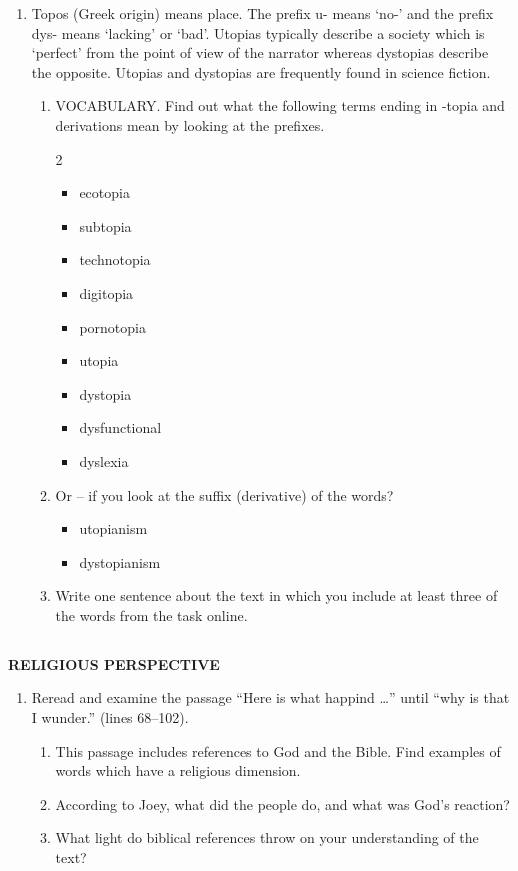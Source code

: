 \documentclass[10pt,a4paper,table]{article}
\newcommand{\qm}[1]{``#1''}
\begin{document}
\begin{enumerate}[label=\arabic*., leftmargin=*]
  \item Topos (Greek origin) means place. The prefix u- means `no-' and the prefix dys- means `lacking' or `bad'. Utopias typically describe a society which is `perfect' from the point of view of the narrator whereas dystopias describe the opposite. Utopias and dystopias are frequently found in science fiction.
  \begin{enumerate}[label=\textbf{\alph*.}, leftmargin=1.5em]
    \item VOCABULARY. Find out what the following terms ending in -topia and derivations mean by looking at the prefixes.
    \begin{multicols}{2}
    \begin{itemize}[leftmargin=1.5em]
      \item ecotopia
      \item subtopia
      \item technotopia
      \item digitopia
      \item pornotopia
      \item utopia
      \item dystopia
      \item dysfunctional
      \item dyslexia
    \end{itemize}
    \end{multicols}

    \item Or -- if you look at the suffix (derivative) of the words?
    \begin{itemize}[leftmargin=1.5em]
      \item utopianism
      \item dystopianism
    \end{itemize}

    \item Write one sentence about the text in which you include at least three of the words from the task online.
  \end{enumerate}
\end{enumerate}

\subsection{}
\textbf{RELIGIOUS PERSPECTIVE}
\begin{enumerate}[label=\arabic*., leftmargin=*]
  \item Reread and examine the passage \qm{Here is what happind \ldots} until \qm{why is that I wunder.} (lines 68--102).
  \begin{enumerate}[label=\textbf{\alph*.}, leftmargin=1.5em]
    \item This passage includes references to God and the Bible. Find examples of words which have a religious dimension.
    \item According to Joey, what did the people do, and what was God's reaction?
    \item What light do biblical references throw on your understanding of the text?
  \end{enumerate}
\end{enumerate}
\end{document}
